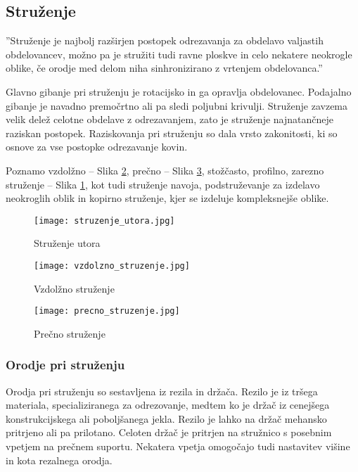 \subsection{Struženje}
''Struženje je najbolj razširjen postopek odrezavanja za
obdelavo valjastih obdelovancev, možno pa je stružiti tudi ravne ploskve
in celo nekatere neokrogle oblike, če orodje med delom niha sinhronizirano
z vrtenjem obdelovanca.'' \cite{sts_arhiv_struzenje}

Glavno gibanje pri struženju je rotacijsko in ga opravlja
obdelovanec. Podajalno gibanje je navadno premočrtno ali pa
sledi poljubni krivulji. Struženje zavzema velik delež celotne
obdelave z odrezavanjem, zato je struženje najnatančneje
raziskan postopek. Raziskovanja pri struženju so dala vrsto
zakonitosti, ki so osnove za vse postopke odrezavanje kovin.

Poznamo vzdolžno -- Slika \ref{vzdolzno_struzenje},
prečno -- Slika \ref{precno_struzenje}, stožčasto, profilno,
zarezno struženje -- Slika \ref{struzenje_utora}, kot tudi
struženje navoja, podstruževanje za izdelavo neokroglih
oblik in kopirno struženje, kjer se izdeluje kompleksnejše oblike.

\begin{figure}[H]
	\begin{center}
		\texttt{[image: struzenje\_utora.jpg]}
		\caption{Struženje utora
			\cite{sts_arhiv_struzenje}}
		\label{struzenje_utora}
	\end{center}
\end{figure}

\begin{figure}[H]
	\begin{center}
		\texttt{[image: vzdolzno\_struzenje.jpg]}
		\caption{Vzdolžno struženje
			\cite{sts_arhiv_struzenje}}
		\label{vzdolzno_struzenje}
	\end{center}
\end{figure}

\begin{figure}[H]
	\begin{center}
		\texttt{[image: precno\_struzenje.jpg]}
		\caption{Prečno struženje
			\cite{sts_arhiv_struzenje}}
		\label{precno_struzenje}
	\end{center}
\end{figure}

\subsubsection{Orodje pri struženju}
Orodja pri struženju so sestavljena iz rezila in držača. Rezilo je
iz tršega materiala, specializiranega za odrezovanje, medtem ko je
držač iz cenejšega konstrukcijskega ali poboljšanega jekla.
Rezilo je lahko na držač mehansko pritrjeno ali pa prilotano.
Celoten držač je pritrjen na stružnico s posebnim
vpetjem na prečnem suportu. Nekatera vpetja omogočajo tudi nastavitev
višine in kota rezalnega orodja.

